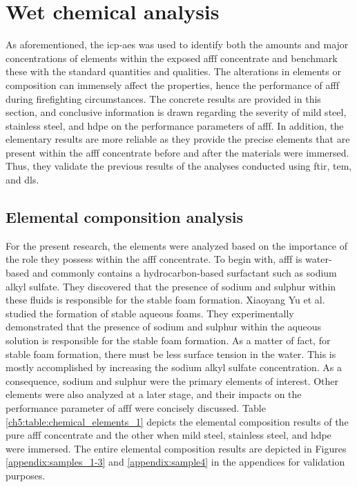 \section{Wet chemical analysis}
\label{ch5:anchor:section:analysis}
As aforementioned, the \acrshort{icp-aes} was used to identify both the amounts and major concentrations of elements within the exposed \acrshort{afff} concentrate and benchmark these with the standard quantities and qualities. The alterations in elements or composition can immensely affect the properties, hence the performance of \acrshort{afff} during firefighting circumstances. The concrete results are provided in this section, and conclusive information is drawn regarding the severity of mild steel, stainless steel, and \acrshort{hdpe} on the performance parameters of \acrshort{afff}. In addition, the elementary results are more reliable as they provide the precise elements that are present within the \acrshort{afff} concentrate before and after the materials were immersed. Thus, they validate the previous results of the analyses conducted using \acrshort{ftir}, \acrshort{tem}, and \acrshort{dls}.

\subsection{Elemental componsition analysis}
For the present research, the elements were analyzed based on the importance of the role they possess within the \acrshort{afff} concentrate. To begin with, \acrshort{afff} is water-based and commonly contains a hydrocarbon-based surfactant such as sodium alkyl sulfate. They discovered that the presence of sodium and sulphur within these fluids is responsible for the stable foam formation. Xiaoyang Yu et al. \cite{yu2020formation} studied the formation of stable aqueous foams. They experimentally demonstrated that the presence of sodium and sulphur within the aqueous solution is responsible for the stable foam formation. As a matter of fact, for stable foam formation, there must be less surface tension in the water. This is mostly accomplished by increasing the sodium alkyl sulfate concentration. As a consequence, sodium and sulphur were the primary elements of interest. Other elements were also analyzed at a later stage, and their impacts on the performance parameter of \acrshort{afff} were concisely discussed. Table \ref{ch5:table:chemical_elements_1} depicts the elemental composition results of the pure \acrshort{afff} concentrate and the other when mild steel, stainless steel, and \acrshort{hdpe} were immersed. The entire elemental composition results are depicted in Figures \ref{appendix:samples_1-3} and \ref{appendix:sample4} in the appendices for validation purposes.

